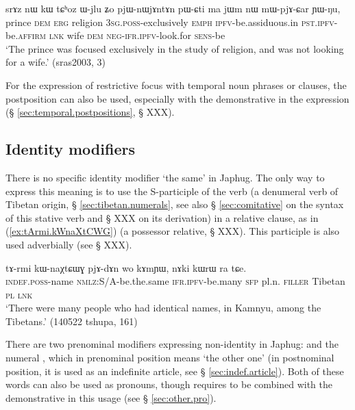 \begin{exe}
\ex \label{ex:Wjlu.Zo}
 \gll srɤz nɯ kɯ tɕʰoz ɯ-jlu ʑo pjɯ-nɯjɤntɤn pɯ-ɕti ma jɯm nɯ mɯ-pjɤ-ɕar ɲɯ-ŋu, \\
prince \textsc{dem} \textsc{erg}  religion \textsc{3sg}.\textsc{poss}-exclusively \textsc{emph} \textsc{ipfv}-be.assiduous.in  \textsc{pst}.\textsc{ipfv}-be.\textsc{affirm} \textsc{lnk} wife \textsc{dem} \textsc{neg}-\textsc{ifr}.\textsc{ipfv}-look.for \textsc{sens}-be \\
 \glt `The prince was focused exclusively in the study of religion, and was not looking for a wife.' (sras2003, 3)
 \end{exe}

For the expression of restrictive focus with temporal noun phrases or clauses, the postposition  can also be used, especially with the demonstrative in the expression  (§ \ref{sec:temporal.postpositions}, § XXX).



\subsection{Identity modifiers} \label{sec:identity.modifier}
There is no specific identity modifier `the same' in Japhug. The only way to express this meaning is to use the S-participle of the verb  (a denumeral verb of Tibetan origin, § \ref{sec:tibetan.numerals}, see also § \ref{sec:comitative} on the syntax of this stative verb and § XXX on its derivation) in a relative clause, as in (\ref{ex:tArmi.kWnaXtCWG}) (a possessor relative, § XXX). This participle is also used adverbially (see § XXX).

\begin{exe}
\ex \label{ex:tArmi.kWnaXtCWG}
\gll tɤ-rmi kɯ-naχtɕɯɣ pjɤ-dɤn wo kɤmɲɯ, nɤki kɯrɯ ra tɕe. \\
\textsc{indef}.\textsc{poss}-name \textsc{nmlz}:S/A-be.the.same \textsc{ifr}.\textsc{ipfv}-be.many \textsc{sfp} pl.n. \textsc{filler} Tibetan \textsc{pl} \textsc{lnk} \\
\glt `There were many people who had identical names, in Kamnyu, among the Tibetans.' (140522 tshupa, 161)
\end{exe}


There are two prenominal modifiers expressing non-identity in Japhug:  and the numeral , which in prenominal position means `the other one' (in postnominal position, it is used as an indefinite article, see § \ref{sec:indef.article}). Both of these words can also be used as pronouns, though  requires to be combined with the demonstrative  in this usage (see § \ref{sec:other.pro}).

